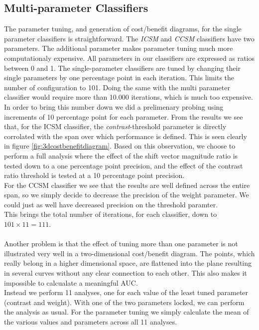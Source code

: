 \subsection{Multi-parameter Classifiers}\label{sec:ph1multiparameter}
%
The parameter tuning, and generation of cost/benefit diagrams, for the single parameter classifiers is straightforward. The \textit{ICSM} and \textit{CCSM} classifiers have two parameters. The additional parameter makes parameter tuning much more computationaly expensive. All parameters in our classifiers are expressed as ratios between 0 and 1. The single-parameter classifiers are tuned by changing their single parameters by one percentage point in each iteration. This limits the number of configuration to 101. Doing the same with the multi parameter classifier would require more than 10.000 iterations, which is much too expensive.\\
In order to bring this number down we did a prelimenary probing using increments of 10 percentage point for each parameter. From the results we see that, for the ICSM classifier, the \textit{contrast}-threshold parameter is directly corrolated with the span over which performance is defined. This is seen clearly in figure \ref{fig:3dcostbenefitdiagram}. Based on this observation, we choose to perform a full analysis where the effect of the shift vector magnitude ratio is tested down to a one percentage point precision, and the effect of the contrast ratio threshold is tested at a 10 percentage point precision.\\
For the CCSM classifier we see that the results are well defined across the entire span, so we simply decide to decrease the precision of the weight parameter. We could just as well have decreased precision on the threshold paramter.\\
This brings the total number of iterations, for each classifier, down to $101 \times 11 = 111$.\\
\\
Another problem is that the effect of tuning more than one parameter is not illustrated very well in a two-dimensional cost/benefit diagram. The points, which really belong in a higher dimensional space, are flattened into the plane resulting in several curves without any clear connection to each other. This also makes it impossible to calcualate a meaningful AUC.\\
Instead we perform 11 analyses, one for each value of the least tuned parameter (contrast and weight). With one of the two parameters locked, we can perform the analysis as usual. For the parameter tuning we simply calculate the mean of the various values and parameters across all 11 analyses.\\
